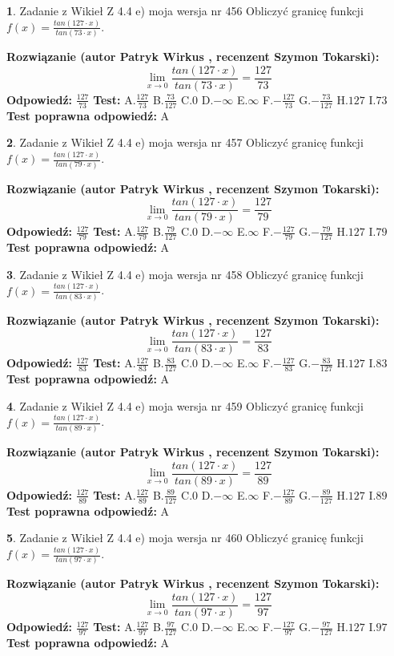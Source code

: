 \documentclass[12pt, a4paper]{article}
\theoremstyle{definition} %
\newtheorem{zad}{}
\newcommand{\zadStart}[1]{\begin{zad}#1\newline}
\newcommand{\zadStop}{\end{zad}}
\newcommand{\rozwStart}[2]{\noindent \textbf{Rozwiązanie (autor #1 , recenzent #2): }\newline}
\newcommand{\rozwStop}{\newline}
\newcommand{\odpStart}{\noindent \textbf{Odpowiedź:}\newline}
\newcommand{\odpStop}{\newline}
\newcommand{\testStart}{\noindent \textbf{Test:}\newline}
\newcommand{\testStop}{\newline}
\newcommand{\kluczStart}{\noindent \textbf{Test poprawna odpowiedź:}\newline}
\newcommand{\kluczStop}{\newline}
\begin{document}
\zadStart{Zadanie z Wikieł Z 4.4 e) moja wersja nr 456}
Obliczyć granicę funkcji $f(x)=\frac{tan(127\cdot x)}{tan(73\cdot x)}$.
\zadStop
\rozwStart{Patryk Wirkus}{Szymon Tokarski}
$$\lim\limits_{x\to 0}\frac{tan(127\cdot x)}{tan(73\cdot x)}=
\frac{127}{73}$$
\rozwStop
\odpStart
$\frac{127}{73}$
\odpStop
\testStart
A.$\frac{127}{73}$
B.$\frac{73}{127}$
C.$0$
D.$-\infty$
E.$\infty$
F.$-\frac{127}{73}$
G.$-\frac{73}{127}$
H.$127$
I.$73$
\testStop
\kluczStart
A
\kluczStop



\zadStart{Zadanie z Wikieł Z 4.4 e) moja wersja nr 457}
Obliczyć granicę funkcji $f(x)=\frac{tan(127\cdot x)}{tan(79\cdot x)}$.
\zadStop
\rozwStart{Patryk Wirkus}{Szymon Tokarski}
$$\lim\limits_{x\to 0}\frac{tan(127\cdot x)}{tan(79\cdot x)}=
\frac{127}{79}$$
\rozwStop
\odpStart
$\frac{127}{79}$
\odpStop
\testStart
A.$\frac{127}{79}$
B.$\frac{79}{127}$
C.$0$
D.$-\infty$
E.$\infty$
F.$-\frac{127}{79}$
G.$-\frac{79}{127}$
H.$127$
I.$79$
\testStop
\kluczStart
A
\kluczStop



\zadStart{Zadanie z Wikieł Z 4.4 e) moja wersja nr 458}
Obliczyć granicę funkcji $f(x)=\frac{tan(127\cdot x)}{tan(83\cdot x)}$.
\zadStop
\rozwStart{Patryk Wirkus}{Szymon Tokarski}
$$\lim\limits_{x\to 0}\frac{tan(127\cdot x)}{tan(83\cdot x)}=
\frac{127}{83}$$
\rozwStop
\odpStart
$\frac{127}{83}$
\odpStop
\testStart
A.$\frac{127}{83}$
B.$\frac{83}{127}$
C.$0$
D.$-\infty$
E.$\infty$
F.$-\frac{127}{83}$
G.$-\frac{83}{127}$
H.$127$
I.$83$
\testStop
\kluczStart
A
\kluczStop



\zadStart{Zadanie z Wikieł Z 4.4 e) moja wersja nr 459}
Obliczyć granicę funkcji $f(x)=\frac{tan(127\cdot x)}{tan(89\cdot x)}$.
\zadStop
\rozwStart{Patryk Wirkus}{Szymon Tokarski}
$$\lim\limits_{x\to 0}\frac{tan(127\cdot x)}{tan(89\cdot x)}=
\frac{127}{89}$$
\rozwStop
\odpStart
$\frac{127}{89}$
\odpStop
\testStart
A.$\frac{127}{89}$
B.$\frac{89}{127}$
C.$0$
D.$-\infty$
E.$\infty$
F.$-\frac{127}{89}$
G.$-\frac{89}{127}$
H.$127$
I.$89$
\testStop
\kluczStart
A
\kluczStop



\zadStart{Zadanie z Wikieł Z 4.4 e) moja wersja nr 460}
Obliczyć granicę funkcji $f(x)=\frac{tan(127\cdot x)}{tan(97\cdot x)}$.
\zadStop
\rozwStart{Patryk Wirkus}{Szymon Tokarski}
$$\lim\limits_{x\to 0}\frac{tan(127\cdot x)}{tan(97\cdot x)}=
\frac{127}{97}$$
\rozwStop
\odpStart
$\frac{127}{97}$
\odpStop
\testStart
A.$\frac{127}{97}$
B.$\frac{97}{127}$
C.$0$
D.$-\infty$
E.$\infty$
F.$-\frac{127}{97}$
G.$-\frac{97}{127}$
H.$127$
I.$97$
\testStop
\kluczStart
A
\kluczStop
\end{document}
